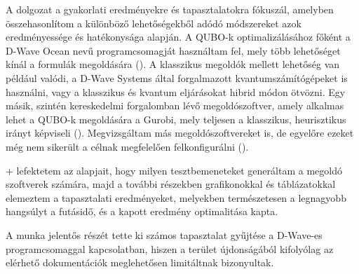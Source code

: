 A dolgozat  a gyakorlati eredményekre és tapasztalatokra fókuszál, amelyben összehasonlítom a különböző lehetőségekből adódó módszereket azok eredményessége és hatékonysága alapján.
A QUBO-k optimalizálásához főként a D-Wave Ocean nevű programcsomagját használtam fel, mely több lehetőséget kínál a formulák megoldására (). A klasszikus megoldók mellett lehetőség van például valódi, a D-Wave Systems által forgalmazott kvantumszámítógépeket is használni, vagy a klasszikus és kvantum eljárásokat hibrid módon ötvözni.
Egy másik, szintén kereskedelmi forgalomban lévő megoldószoftver, amely alkalmas lehet a QUBO-k megoldására a Gurobi, mely teljesen a klasszikus, heurisztikus irányt képviseli (). Megvizsgáltam más megoldószoftvereket is, de egyelőre ezeket még nem sikerült a célnak megfelelően felkonfigurálni ().

\Az+ lefektetem az alapjait, hogy milyen tesztbemeneteket generáltam a megoldó szoftverek számára, majd a további részekben grafikonokkal és táblázatokkal elemeztem a tapasztalati eredményeket, melyekben természetesen a legnagyobb hangsúlyt a futásidő, és a kapott eredmény optimalitása kapta.

A munka jelentős részét tette ki számos tapasztalat gyűjtése a D-Wave-es programcsomaggal kapcsolatban, hiszen a terület újdonságából kifolyólag az elérhető dokumentációk meglehetősen limitáltnak bizonyultak.